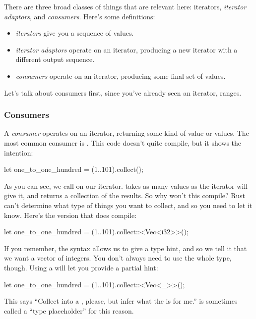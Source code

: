 There are three broad classes of things that are relevant here: iterators, \emph{iterator adaptors}, and \emph{consumers}. Here's 
some definitions:

\begin{itemize}
  \item{\emph{iterators} give you a sequence of values.}
  \item{\emph{iterator adaptors} operate on an iterator, producing a new iterator with a different output sequence.}
  \item{\emph{consumers} operate on an iterator, producing some final set of values.}
\end{itemize}

Let's talk about consumers first, since you've already seen an iterator, ranges.

\subsubsection*{Consumers}

A \emph{consumer} operates on an iterator, returning some kind of value or values. The most common consumer is . This 
code doesn't quite compile, but it shows the intention:

\begin{rustc}
let one_to_one_hundred = (1..101).collect();
\end{rustc}

As you can see, we call  on our iterator.  takes as many values as the iterator will give it, 
and returns a collection of the results. So why won't this compile? Rust can't determine what type of things you want to collect, 
and so you need to let it know. Here's the version that does compile:

\begin{rustc}
let one_to_one_hundred = (1..101).collect::<Vec<i32>>();
\end{rustc}

If you remember, the \code{::<>} syntax allows us to give a type hint, and so we tell it that we want a vector of integers. You 
don't always need to use the whole type, though. Using a \code{\_} will let you provide a partial hint:

\begin{rustc}
let one_to_one_hundred = (1..101).collect::<Vec<_>>();
\end{rustc}

This says \enquote{Collect into a , please, but infer what the  is for me.} \code{\_} is sometimes called a 
\enquote{type placeholder} for this reason.

